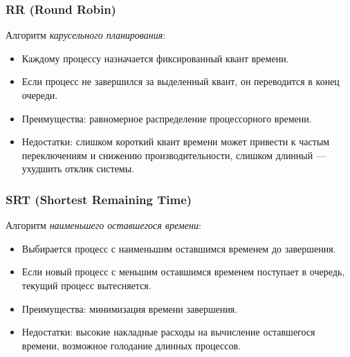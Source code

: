 \documentclass[a4paper, 12pt]{report}
\numberwithin{equation}{section}
\begin{document}
\subsubsection*{RR (Round Robin)}
Алгоритм \textit{карусельного планирования}:
\begin{itemize}
    \item Каждому процессу назначается фиксированный квант времени.
    \item Если процесс не завершился за выделенный квант, он переводится в конец очереди.
    \item Преимущества: равномерное распределение процессорного времени.
    \item Недостатки: слишком короткий квант времени может привести к частым переключениям и снижению производительности, слишком длинный — ухудшить отклик системы.
\end{itemize}

\subsubsection*{SRT (Shortest Remaining Time)}
Алгоритм \textit{наименьшего оставшегося времени}:
\begin{itemize}
    \item Выбирается процесс с наименьшим оставшимся временем до завершения.
    \item Если новый процесс с меньшим оставшимся временем поступает в очередь, текущий процесс вытесняется.
    \item Преимущества: минимизация времени завершения.
    \item Недостатки: высокие накладные расходы на вычисление оставшегося времени, возможное голодание длинных процессов.
\end{itemize}
\end{document}
